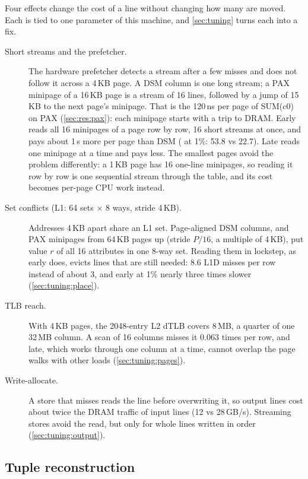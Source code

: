 Four effects change the cost of a line without changing how many are moved. Each is tied to
one parameter of this machine, and \cref{sec:tuning} turns each into a fix.
\begin{description}
\item[Short streams and the prefetcher.] The hardware prefetcher detects a stream after a few
misses and does not follow it across a 4\,KB page. A DSM column is one long stream; a PAX
minipage of a 16\,KB page is a stream of 16 lines, followed by a jump of 15\,KB to the next
page's minipage. That is the 120\,ns per page of SUM(c0) on PAX (\cref{sec:res:pax}): each
minipage starts with a trip to DRAM. Early reads all 16 minipages of a page row by row, 16
short streams at once, and pays about 1\,\textmu s more per page than DSM ( at
1\%: 53.8 vs 22.7\ms). Late reads one minipage at a time and pays less. The smallest pages
avoid the problem differently: a 1\,KB page has 16 one-line minipages, so reading it row by row
is one sequential stream through the table, and its cost becomes per-page CPU work instead.
\item[Set conflicts (L1: 64 sets $\times$ 8 ways, stride 4\,KB).] Addresses 4\,KB apart share an
L1 set. Page-aligned DSM columns, and PAX minipages from 64\,KB pages up (stride $P/16$, a
multiple of 4\,KB), put value $r$ of all 16 attributes in one 8-way set. Reading them in
lockstep, as early does, evicts lines that are still needed: 8.6 L1D misses per row instead of
about 3, and early  at 1\% nearly three times slower (\cref{sec:tuning:place}).
\item[TLB reach.] With 4\,KB pages, the 2048-entry L2 dTLB covers 8\,MB, a quarter of one 32\,MB column.
A scan of 16 columns misses it 0.063 times per row, and late, which works through one column at
a time, cannot overlap the page walks with other loads (\cref{sec:tuning:pages}).
\item[Write-allocate.] A store that misses reads the line before overwriting it, so output
lines cost about twice the DRAM traffic of input lines (12 vs 28\,GB/s). Streaming stores avoid
the read, but only for whole lines written in order (\cref{sec:tuning:output}).
\end{description}

\subsection{Tuple reconstruction}
\label{sec:analysis:recon}

